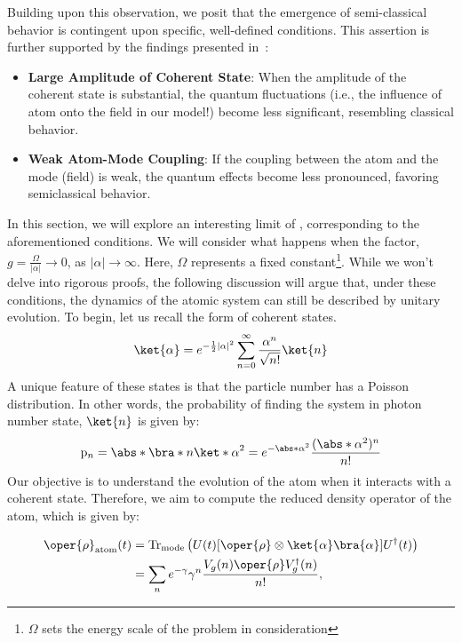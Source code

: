 Building upon this observation, we posit that the emergence of semi-classical behavior is contingent upon specific, well-defined conditions. This assertion is further supported by the findings presented in~\cite{semiclassical_limit_JC_PRL}:
\begin{itemize}
    \item \textbf{Large Amplitude of Coherent State}: When the amplitude of the coherent state is substantial, 
    the quantum fluctuations (i.e., the influence of atom onto the field in our model!) become less significant, 
    resembling classical behavior.
    \item \textbf{Weak Atom-Mode Coupling}: If the coupling between the atom and the mode (field) is weak, 
    the quantum effects become less pronounced, favoring semiclassical behavior.
\end{itemize}
In this section, we will explore an interesting limit of , corresponding to the aforementioned conditions. We will consider what happens when the factor, $g = \frac{\Omega}{|\alpha|} \to 0$, as $|\alpha| \rightarrow \infty$. Here, $\Omega$ represents a fixed constant\footnote{\(\Omega\) sets the energy  scale of the problem in consideration}. While we won't delve into rigorous proofs, the following discussion will argue that, under these conditions, the dynamics of the atomic system can still be described by unitary evolution. To begin, let us recall the form of coherent states.
\begin{equation}
    \ket{\alpha} = e^{-\frac{1}{2}|\alpha|^2} \sum_{n=0}^{\infty} \frac{\alpha^n}{\sqrt{n!}} \ket{n}
\end{equation}
A unique feature of these states is that the particle number has a Poisson distribution. In other words, the probability of finding the system in photon number state, \(\ket{n}\) is given by:
\begin{equation}
    \mathrm{p}_n = \abs*{\bra*{n}\ket*{\alpha}}^2 
    = e^{-\abs*{\alpha}^2}\frac{(\abs*{\alpha}^2)^n}{n!}
\end{equation}
Our objective is to understand the evolution of the atom when it interacts with a coherent state. 
Therefore, we aim to compute the reduced density operator of the atom, which is given by:

\begin{align}
\oper{\rho}_{\text{atom}}(t) &= 
\text{Tr}_{\text{mode}} \left( U(t)[\oper{\rho} \otimes \ket{\alpha}\bra{\alpha}]U^\dagger(t) \right) \nonumber \\
 &= \sum_n e^{-\gamma} \gamma^n \frac{V_g(n)\oper{\rho} V_g^\dagger(n)}{n!},
\end{align}

